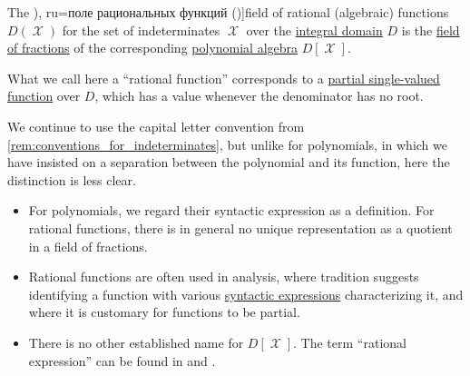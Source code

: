 \begin{definition}\label{def:rational_function_field}
  The \term[bg=поле на рационалните функции (\cite[360]{ГеновМиховскиМоллов1991Алгебра}), ru=поле рациональных функций (\cite[18]{Шафаревич2019ОсновныеПонятияАлгебры})]{field of rational (algebraic) functions} \( D(\mscrX) \) for the set of indeterminates \( \mscrX \) over the \hyperref[def:integral_domain]{integral domain} \( D \) is the \hyperref[def:field_of_fractions]{field of fractions} of the corresponding \hyperref[def:polynomial_algebra]{polynomial algebra} \( D[\mscrX] \).
\end{definition}
\begin{comments}
  \item What we call here a \enquote{rational function} corresponds to a \hyperref[def:set_valued_map/partial]{partial single-valued function} over \( D \), which has a value whenever the denominator has no root.

  We continue to use the capital letter convention from \cref{rem:conventions_for_indeterminates}, but unlike for polynomials, in which we have insisted on a separation between the polynomial and its function, here the distinction is less clear.
  \begin{itemize}
    \item For polynomials, we regard their syntactic expression as a definition. For rational functions, there is in general no unique representation as a quotient in a field of fractions.

    \item Rational functions are often used in analysis, where tradition suggests identifying a function with various \hyperref[con:expression]{syntactic expressions} characterizing it, and where it is customary for functions to be partial.

    \item There is no other established name for \( D[\mscrX] \). The term \enquote{rational expression} can be found in \cite[232]{Jacobson1985BasicAlgebraI} and \cite[384]{Knapp2016BasicAlgebra}.
  \end{itemize}
\end{comments}

